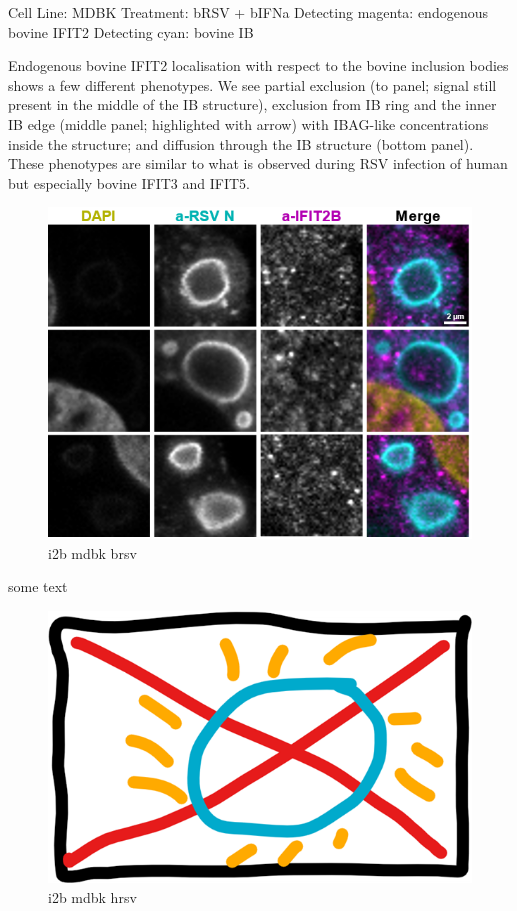 Cell Line: MDBK \newline
Treatment: bRSV + bIFNa \newline
Detecting magenta: endogenous bovine IFIT2  \newline
Detecting cyan: bovine IB \newline

Endogenous bovine IFIT2 localisation with respect to the bovine inclusion bodies shows a few different phenotypes. We see partial exclusion (to panel; signal still present in the middle of the IB structure), exclusion from IB ring and the inner IB edge (middle panel; highlighted with arrow) with IBAG-like concentrations inside the structure; and diffusion through the IB structure (bottom panel). These phenotypes are similar to what is observed during RSV infection of human but especially bovine IFIT3 and IFIT5.

\begin{figure}
    \centering
    \includegraphics[width=1\linewidth]{09. Chapter 4//Figs//02. I2B/06. i2b mdbk brsv.png}
    \caption[i2b mdbk brsv]{i2b mdbk brsv}
    \label{i2b mdbk brsv}
\end{figure}

some text

\begin{figure}
    \centering
    \includegraphics[width=0.5\linewidth]{09. Chapter 4//Figs//02. I2B/00. placeholder.png}
    \caption[i2b mdbk hrsv]{i2b mdbk hrsv}
    \label{i2b mdbk hrsv}
\end{figure}


